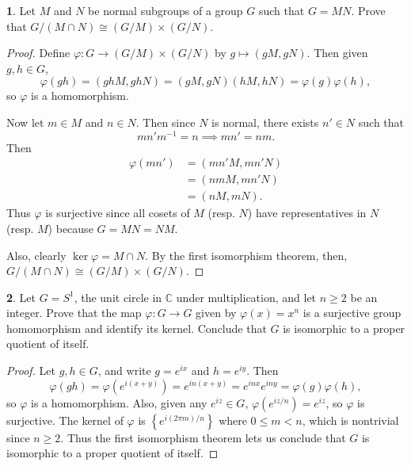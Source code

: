 \documentclass[12pt]{article}
\theoremstyle{definition}
\newtheorem{ex}{}
\begin{document}
\begin{ex}
	Let $M$ and $N$ be normal subgroups of a group $G$ such that $G = MN$.
	Prove that $G/(M \cap N) \cong (G/M) \times (G/N)$.
\end{ex}
\begin{proof}
	Define $\varphi : G \to (G/M) \times (G/N)$ by $g \mapsto (gM, gN)$.
	Then given $g, h \in G$, \begin{equation*}
		\varphi(gh) = (ghM, ghN) = (gM, gN)(hM, hN) = \varphi(g)\varphi(h),
	\end{equation*}
	so $\varphi$ is a homomorphism.

	Now let $m \in M$ and $n \in N$.
	Then since $N$ is normal, there exists $n' \in N$ such that \begin{equation*}
		mn'm^{-1} = n \implies mn' = nm.
	\end{equation*}
	Then \begin{align*}
		\varphi(mn') & = (mn'M, mn'N) \\
		             & = (nmM, mn'N)  \\
		             & = (nM, mN).
	\end{align*}
	Thus $\varphi$ is surjective since all cosets of $M$ (resp. $N$) have representatives in $N$ (resp. $M$) because $G = MN = NM$.

	Also, clearly $\ker \varphi = M \cap N$.
	By the first isomorphism theorem, then, $G/(M \cap N) \cong (G/M) \times (G/N)$.
\end{proof}

\begin{ex}
	Let $G = S^1$, the unit circle in $\mathbb{C}$ under multiplication, and let $n \geq 2$ be an integer.
	Prove that the map $\varphi : G \to G$ given by $\varphi(x) = x^n$ is a surjective group homomorphism and identify its kernel.
	Conclude that $G$ is isomorphic to a proper quotient of itself.
\end{ex}
\begin{proof}
	Let $g, h \in G$, and write $g = e^{ix}$ and $h = e^{iy}$.
	Then \begin{equation*}
		\varphi(gh) = \varphi(e^{i(x + y)}) = e^{in(x + y)} = e^{inx}e^{iny} = \varphi(g)\varphi(h),
	\end{equation*}
	so $\varphi$ is a homomorphism.
	Also, given any $e^{iz} \in G$, $\varphi(e^{i z/n}) = e^{iz}$, so $\varphi$ is surjective.
	The kernel of $\varphi$ is $\left\lbrace e^{i (2\pi m)/n} \right\rbrace$ where $0 \leq m < n$, which is nontrivial since $n \geq 2$.
	Thus the first isomorphism theorem lets us conclude that $G$ is isomorphic to a proper quotient of itself.
\end{proof}
\end{document}
